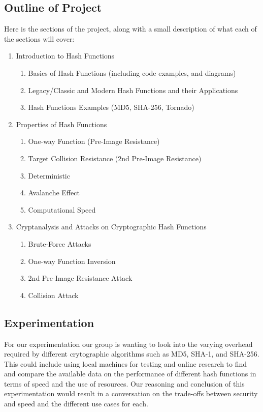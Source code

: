 \documentclass[12pt,english]{article}
\begin{document}
\subsection{Outline of Project}
Here is the sections of the project, along with a small description 
of what each of the sections will cover:
\begin{enumerate}[{\bf (a.)}]
    \item Introduction to Hash Functions
    \begin{enumerate}
        \item Basics of Hash Functions (including code examples, and diagrams)
        \item Legacy/Classic and Modern Hash Functions and their Applications
        \item Hash Functions Examples (MD5, SHA-256, Tornado)
    \end{enumerate} 
    \item Properties of Hash Functions
    \begin{enumerate}
        \item One-way Function (Pre-Image Resistance)
        \item Target Collision Resistance (2nd Pre-Image Resistance)
        \item Deterministic
        \item Avalanche Effect
        \item Computational Speed
    \end{enumerate}
    \item Cryptanalysis and Attacks on Cryptographic Hash Functions
    \begin{enumerate}
        \item Brute-Force Attacks
        \item One-way Function Inversion
        \item 2nd Pre-Image Resistance Attack
        \item Collision Attack
    \end{enumerate}
\end{enumerate}
\subsection{Experimentation}
For our experimentation our group is wanting to look into the varying overhead required by different crytographic algorithms such as MD5, SHA-1, and SHA-256. This could include using local machines for testing and online research to find and compare the available data on the performance of different hash functions in terms of speed and the use of resources. Our reasoning and conclusion of this experimentation would result in a conversation on the trade-offs between security and speed and the different use cases for each.
\end{document}
